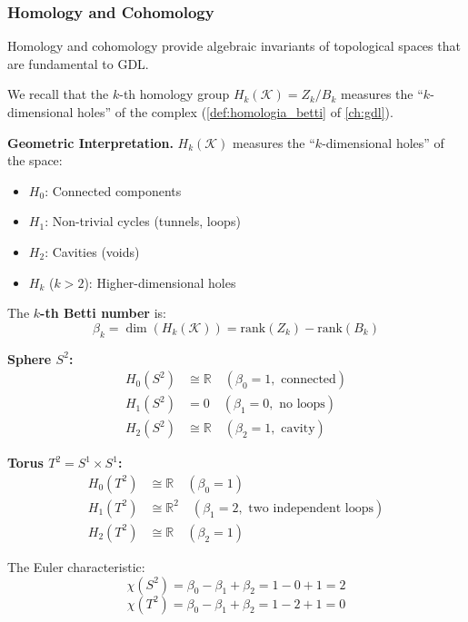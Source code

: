 \subsubsection{Homology and Cohomology}

Homology and cohomology provide algebraic invariants of topological spaces that are fundamental to \gls{GDL}.

We recall that the $k$-th homology group $H_k(\mathcal{K}) = Z_k / B_k$ measures the ``$k$-dimensional holes'' of the complex (\autoref{def:homologia_betti} of \autoref{ch:gdl}).\label{def:grupos_homologia_cnn}

\textbf{Geometric Interpretation.}\label{rem:interp_homologia} $H_k(\mathcal{K})$ measures the ``$k$-dimensional holes'' of the space:
\begin{itemize}
    \item $H_0$: Connected components
    \item $H_1$: Non-trivial cycles (tunnels, loops)
    \item $H_2$: Cavities (voids)
    \item $H_k$ ($k > 2$): Higher-dimensional holes
\end{itemize}

\begin{definition}\label{def:numeros_betti_cnn}
The \textbf{$k$-th Betti number} is:
\[\beta_k = \dim(H_k(\mathcal{K})) = \text{rank}(Z_k) - \text{rank}(B_k)\]
\end{definition}

\begin{example}\label{ex:homologia_esfera_toro}
\textbf{Sphere $S^2$:}
\begin{align}
H_0(S^2) &\cong \mathbb{R} \quad (\beta_0 = 1, \text{ connected}) \\
H_1(S^2) &= 0 \quad (\beta_1 = 0, \text{ no loops}) \\
H_2(S^2) &\cong \mathbb{R} \quad (\beta_2 = 1, \text{ cavity})
\end{align}

\textbf{Torus $T^2 = S^1 \times S^1$:}
\begin{align}
H_0(T^2) &\cong \mathbb{R} \quad (\beta_0 = 1) \\
H_1(T^2) &\cong \mathbb{R}^2 \quad (\beta_1 = 2, \text{ two independent loops}) \\
H_2(T^2) &\cong \mathbb{R} \quad (\beta_2 = 1)
\end{align}

The Euler characteristic:
\[\chi(S^2) = \beta_0 - \beta_1 + \beta_2 = 1 - 0 + 1 = 2\]
\[\chi(T^2) = \beta_0 - \beta_1 + \beta_2 = 1 - 2 + 1 = 0\]
\end{example}

